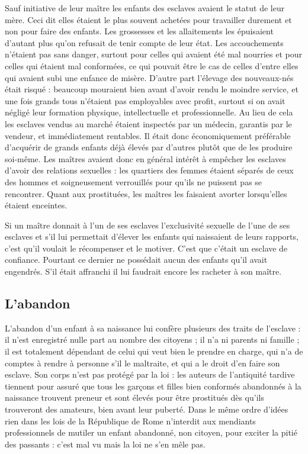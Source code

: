 Sauf initiative de leur maître les enfants des esclaves avaient le statut
de leur mère. Ceci dit elles étaient le plus souvent achetées pour travailler
durement et non pour faire des enfants. Les grossesses et les allaitements
les épuisaient d'autant plus qu'on refusait de tenir compte de
leur état. Les accouchements n'étaient pas sans danger, surtout pour celles
qui avaient été mal nourries et pour celles qui étaient mal conformées,
ce qui pouvait être le cas de celles d'entre elles qui avaient subi une enfance
de misère. D'autre part l'élevage des nouveaux-nés était risqué :
beaucoup mouraient bien avant d'avoir rendu le moindre service, et une
fois grands tous n'étaient pas employables avec profit, surtout si on avait
négligé leur formation physique, intellectuelle et professionnelle. Au lieu
de cela les esclaves vendus au marché étaient inspectés par un médecin,
garantis par le vendeur, et immédiatement rentables. Il était donc économiquement
préférable d'acquérir de grands enfants déjà élevés par
d'autres plutôt que de les produire soi-même. Les maîtres avaient donc
en général intérêt à empêcher les esclaves d'avoir des relations sexuelles :
les quartiers des femmes étaient séparés de ceux des hommes et soigneusement
verrouillés pour qu'ils ne puissent pas se rencontrer. Quant aux
prostituées, les maîtres les faisaient avorter lorsqu'elles étaient enceintes.

Si un maître donnait à l'un de ses esclaves l'exclusivité sexuelle de
l'une de ses esclaves et s'il lui permettait d'élever les enfants qui naissaient
de leurs rapports, c'est qu'il voulait le récompenser et le motiver.
C'est que c'était un esclave de confiance. Pourtant ce dernier ne possédait
aucun des enfants qu'il avait engendrés. S'il était affranchi il lui faudrait
encore les racheter à son maître.

\subsection{L'abandon}

L'abandon d'un enfant à sa naissance lui confère plusieurs des
traits de l'esclave : il n'est enregistré nulle part au nombre des citoyens ; il
n'a ni parents ni famille ; il est totalement dépendant de celui qui veut
bien le prendre en charge, qui n'a de comptes à rendre à personne s'il le
maltraite, et qui a le droit d'en faire son esclave. Son corps n'est pas protégé
par la loi : les auteurs de l'antiquité tardive tiennent pour assuré que
tous les garçons et filles bien conformés abandonnés à la naissance trouvent
preneur et sont élevés pour être prostitués dès qu'ils trouveront des
amateurs, bien avant leur puberté. Dans le même ordre d'idées rien dans
les lois de la République de Rome n'interdit aux mendiants professionnels
de mutiler un enfant abandonné, non citoyen, pour exciter la
pitié des passants : c'est mal vu mais la loi ne s'en mêle pas.

